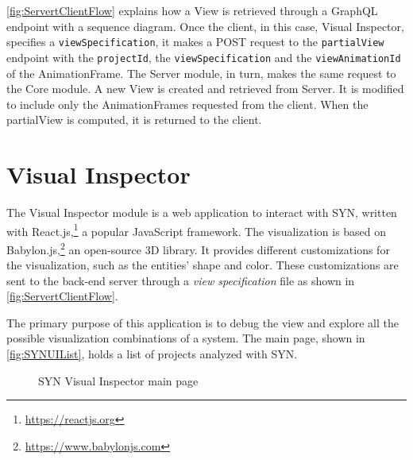 \autoref{fig:ServertClientFlow} explains how a View is retrieved through a GraphQL endpoint with a sequence diagram. Once the client, in this case, Visual Inspector, specifies a \texttt{viewSpecification}, it makes a POST request to the 
\texttt{partialView} endpoint with the \texttt{projectId}, the \texttt{viewSpecification} and the \texttt{viewAnimationId} of the AnimationFrame. The Server module, in turn, makes the same request to the Core module. A new View is created and retrieved from Server. It is modified to include only the AnimationFrames requested from the client. When the partialView is computed, it is returned to the client. 

\newpage
\section{Visual Inspector}
\label{s:SYNDebugger}

The Visual Inspector module is a web application to interact with SYN, written with React.js,\footnote{\url{https://reactjs.org}} a popular JavaScript framework. 
The visualization is based on Babylon.js,\footnote{\url{https://www.babylonjs.com}} an open-source 3D library. 
It provides different customizations for the visualization, such as the entities' shape and color. 
These customizations are sent to the back-end server through a {\em view specification} file as shown in \autoref{fig:ServertClientFlow}. 

The primary purpose of this application is to debug the view and explore all the possible visualization combinations of a system.
The main page, shown in \autoref{fig:SYNUIList}, holds a list of projects analyzed with SYN.

\begin{figure}[h]
    \center
    \caption{SYN Visual Inspector main page}
    \label{fig:SYNUIList}
\end{figure}

